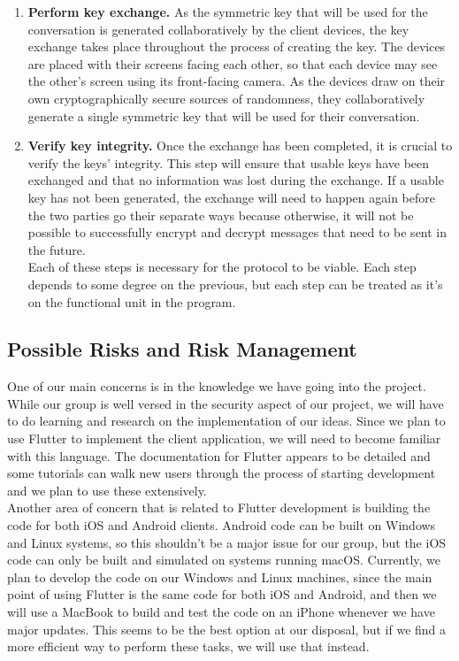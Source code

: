 \documentclass[11pt]{article}
\begin{document}
\begin{enumerate}
	\item{\textbf{Perform key exchange.} As the symmetric key that will be used for the conversation is generated collaboratively by the client devices, the key exchange takes place throughout the process of creating the key. The devices are placed with their screens facing each other, so that each device may see the other’s screen using its front-facing camera. As the devices draw on their own cryptographically secure sources of randomness, they collaboratively generate a single symmetric key that will be used for their conversation.}
	
	\item{\textbf{Verify key integrity.} Once the exchange has been completed, it is crucial to verify the keys’ integrity. This step will ensure that usable keys have been exchanged and that no information was lost during the exchange. If a usable key has not been generated, the exchange will need to happen again before the two parties go their separate ways because otherwise, it will not be possible to successfully encrypt and decrypt messages that need to be sent in the future.\\
	
Each of these steps is necessary for the protocol to be viable. Each step depends to some degree on the previous, but each step can be treated as it’s on the functional unit in the program.}
	
\end{enumerate}

\subsection{Possible Risks and Risk Management}
One of our main concerns is in the knowledge we have going into the project. While our group is well versed in the security aspect of our project, we will have to do learning and research on the implementation of our ideas. Since we plan to use Flutter to implement the client application, we will need to become familiar with this language. The documentation for Flutter appears to be detailed and some tutorials can walk new users through the process of starting development and we plan to use these extensively. \\

Another area of concern that is related to Flutter development is building the code for both iOS and Android clients. Android code can be built on Windows and Linux systems, so this shouldn’t be a major issue for our group, but the iOS code can only be built and simulated on systems running macOS. Currently, we plan to develop the code on our Windows and Linux machines, since the main point of using Flutter is the same code for both iOS and Android, and then we will use a MacBook to build and test the code on an iPhone whenever we have major updates. This seems to be the best option at our disposal, but if we find a more efficient way to perform these tasks, we will use that instead.
\end{document}
